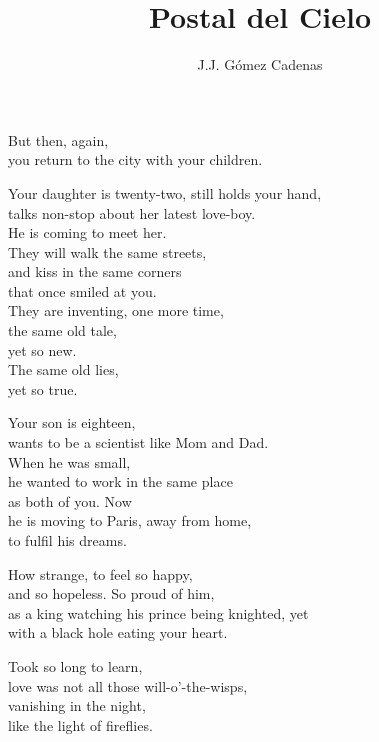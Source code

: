 \documentclass[12pt,twoside]{article}
\title{Postal del Cielo}
\author{J.J. Gómez Cadenas}
\begin{document}
\maketitle

\begin{poem}
\begin{stanza}
But then, again,\\
you return to the city with your children.
\end{stanza}
\begin{stanza}
Your daughter is twenty-two, still holds your hand,\\
talks non-stop about her latest love-boy.\\
He is coming to meet her.\\
They will walk the same streets,\\
and kiss in the same corners\\
that once smiled at you.\\
They are inventing, one more time,\\
the same old tale,\\
yet so new.\\
The same old lies,\\
yet so true.
\end{stanza}
\begin{stanza}
Your son is eighteen,\\
wants to be a scientist like Mom and Dad.\\
When he was small,\\
he wanted to work in the same place\\
as both of you. Now\\
he is moving to Paris, away from home,\\
to fulfil his dreams.
\end{stanza}
\begin{stanza}
How strange, to feel so happy,\\
and so hopeless. So proud of him,\\
as a king watching his prince being knighted, yet\\
with a black hole eating your heart.
\end{stanza}
\begin{stanza}
Took so long to learn,\\
love was not all those will-o'-the-wisps,\\
vanishing in the night,\\
like the light of fireflies.
\end{stanza}

\end{poem}
\end{document}
